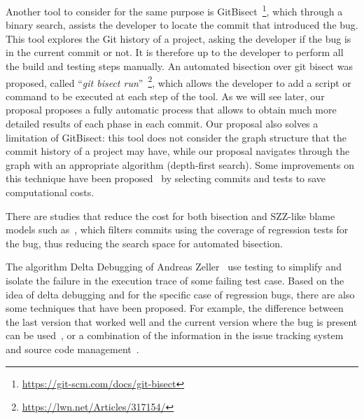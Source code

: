 Another tool to consider for the same purpose is GitBisect~\footnote{\url{https://git-scm.com/docs/git-bisect}}, which through a binary search, assists the developer to locate the commit that introduced the bug. This tool explores the Git history of a project, asking the developer if the bug is in the current commit or not. 
It is therefore up to the developer to perform all the build and testing steps manually. 
An automated bisection over git bisect was proposed, called ``\textit{git bisect run}''~\footnote{\url{https://lwn.net/Articles/317154/}}, which allows the developer to add a script or command to be executed at each step of the tool.
As we will see later, our proposal proposes a fully automatic process that allows to obtain much more detailed results of each phase in each commit. 
Our proposal also solves a limitation of GitBisect: this tool does not consider the graph structure that the commit history of a project may have, while our proposal navigates through the graph with an appropriate algorithm (depth-first search).
Some improvements on this technique have been proposed~\cite{saha2017selective} by selecting commits and tests to save computational costs.


There are studies that reduce the cost for both bisection and SZZ-like blame models such as~\cite{an2021reducing}, which filters commits using the coverage of regression tests for the bug, thus reducing the search space for automated bisection.

The algorithm Delta Debugging of Andreas Zeller~\cite{zeller2002simplifying,zeller2002isolating} use testing to simplify and isolate the failure in the execution trace of some failing test case.
Based on the idea of delta debugging and for the specific case of regression bugs, there are also some techniques that have been proposed. 
For example, the difference between the last version that worked well and the current version where the bug is present can be used~\cite{saha2017selective}, or a combination of the information in the issue tracking system and source code management~\cite{khattar2015sarathi}.

